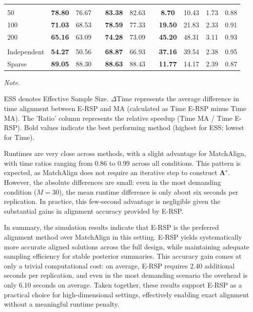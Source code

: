 \documentclass[
  man,
  longtable,
  nolmodern,
  notxfonts,
  notimes,
  colorlinks=true,linkcolor=blue,citecolor=blue,urlcolor=blue]{apa7}
\theoremstyle{plain}
\theoremstyle{plain}
\theoremstyle{remark}
\begin{document}
\begin{table}
\begin{threeparttable}
\begin{tabular}[t]{lcccccccccc}
\addlinespace[0.3em]
\multicolumn{11}{l}{\textbf{J}}\\
\hspace{1em}50 & \textbf{78.80} & 76.67 &  & \textbf{83.38} & 82.63 &  & \textbf{8.70} & 10.43 & 1.73 & 0.88\\
\hspace{1em}100 & \textbf{71.03} & 68.53 &  & \textbf{78.59} & 77.33 &  & \textbf{19.50} & 21.83 & 2.33 & 0.91\\
\hspace{1em}200 & \textbf{65.16} & 63.09 &  & \textbf{74.28} & 73.09 &  & \textbf{45.20} & 48.31 & 3.11 & 0.93\\
\addlinespace[0.3em]
\multicolumn{11}{l}{\textbf{Lambda}}\\
\hspace{1em}Independent & \textbf{54.27} & 50.56 &  & \textbf{68.87} & 66.93 &  & \textbf{37.16} & 39.54 & 2.38 & 0.95\\
\hspace{1em}Sparse & \textbf{89.05} & 88.30 &  & \textbf{88.63} & 88.43 &  & \textbf{11.77} & 14.17 & 2.39 & 0.87\\
\bottomrule
\end{tabular}
\begin{tablenotes}
\item \textit{Note.} 
\item ESS denotes Effective Sample Size. $\Delta$Time represents the average difference in time alignment between E-RSP and MA (calculated as Time E-RSP minus Time MA). The 'Ratio' column represents the relative speedup (Time MA / Time E-RSP). Bold values indicate the best performing method (highest for ESS; lowest for Time).
\end{tablenotes}
\end{threeparttable}
\end{table}

Runtimes are very close across methods, with a slight advantage for
MatchAlign, with time ratios ranging from 0.86 to 0.99 across all
conditions. This pattern is expected, as MatchAlign does not require an
iterative step to construct \(\mathbf\Lambda^\star\). However, the
absolute differences are small: even in the most demanding condition
(\(M=30\)), the mean runtime difference is only about six seconds per
replication. In practice, this few-second advantage is negligible given
the substantial gains in alignment accuracy provided by E-RSP.

In summary, the simulation results indicate that E-RSP is the preferred
alignment method over MatchAlign in this setting. E-RSP yields
systematically more accurate aligned solutions across the full design,
while maintaining adequate sampling efficiency for stable posterior
summaries. This accuracy gain comes at only a trivial computational
cost: on average, E-RSP requires 2.40 additional seconds per
replication, and even in the most demanding scenario the overhead is
only 6.10 seconds on average. Taken together, these results support
E-RSP as a practical choice for high-dimensional settings, effectively
enabling exact alignment without a meaningful runtime penalty.
\end{document}
